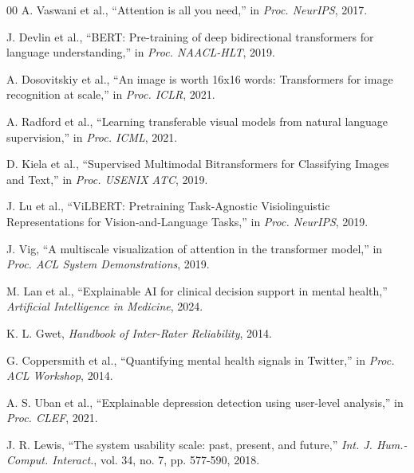 \documentclass[conference]{IEEEtran}
\begin{document}
\begin{thebibliography}{00}
A. Vaswani et al., ``Attention is all you need,'' in \emph{Proc. NeurIPS}, 2017.

J. Devlin et al., ``BERT: Pre-training of deep bidirectional transformers for language understanding,'' in \emph{Proc. NAACL-HLT}, 2019.

A. Dosovitskiy et al., ``An image is worth 16x16 words: Transformers for image recognition at scale,'' in \emph{Proc. ICLR}, 2021.

A. Radford et al., ``Learning transferable visual models from natural language supervision,'' in \emph{Proc. ICML}, 2021.

D. Kiela et al., ``Supervised Multimodal Bitransformers for Classifying Images and Text,'' in \emph{Proc. USENIX ATC}, 2019.

J. Lu et al., ``ViLBERT: Pretraining Task-Agnostic Visiolinguistic Representations for Vision-and-Language Tasks,'' in \emph{Proc. NeurIPS}, 2019.

J. Vig, ``A multiscale visualization of attention in the transformer model,'' in \emph{Proc. ACL System Demonstrations}, 2019.

M. Lan et al., ``Explainable AI for clinical decision support in mental health,'' \emph{Artificial Intelligence in Medicine}, 2024.

K. L. Gwet, \emph{Handbook of Inter-Rater Reliability}, 2014.

G. Coppersmith et al., ``Quantifying mental health signals in Twitter,'' in \emph{Proc. ACL Workshop}, 2014.

A. S. Uban et al., ``Explainable depression detection using user-level analysis,'' in \emph{Proc. CLEF}, 2021.

J. R. Lewis, ``The system usability scale: past, present, and future,'' \emph{Int. J. Hum.-Comput. Interact.}, vol. 34, no. 7, pp. 577-590, 2018.

\end{thebibliography}
\end{document}

